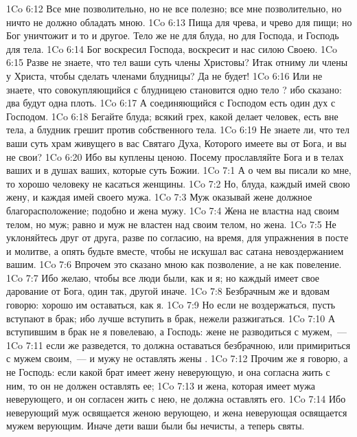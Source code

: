 \rsbpar\vs 1Co 6:12 Все мне позволительно, но не все полезно; все мне позволительно, но ничто не должно обладать мною.
\vs 1Co 6:13 Пища для чрева, и чрево для пищи; но Бог уничтожит и то и другое. Тело же не для блуда, но для Господа, и Господь для тела.
\vs 1Co 6:14 Бог воскресил Господа, воскресит и нас силою Своею.
\rsbpar\vs 1Co 6:15 Разве не знаете, что тел ваши суть члены Христовы? Итак отниму ли члены у Христа, чтобы сделать  членами блудницы? Да не будет!
\vs 1Co 6:16 Или не знаете, что совокупляющийся с блудницею становится одно тело ? ибо сказано: два будут одна плоть.
\vs 1Co 6:17 А соединяющийся с Господом есть один дух с Господом.
\vs 1Co 6:18 Бегайте блуда; всякий грех, какой делает человек, есть вне тела, а блудник грешит против собственного тела.
\vs 1Co 6:19 Не знаете ли, что тел ваши суть храм живущего в вас Святаго Духа, Которого имеете вы от Бога, и вы не свои?
\vs 1Co 6:20 Ибо вы куплены  ценою. Посему прославляйте Бога и в телах ваших и в душах ваших, которые суть Божии.
\vs 1Co 7:1 А о чем вы писали ко мне, то хорошо человеку не касаться женщины.
\vs 1Co 7:2 Но,  блуда, каждый имей свою жену, и каждая имей своего мужа.
\vs 1Co 7:3 Муж оказывай жене должное благорасположение; подобно и жена мужу.
\vs 1Co 7:4 Жена не властна над своим телом, но муж; равно и муж не властен над своим телом, но жена.
\vs 1Co 7:5 Не уклоняйтесь друг от друга, разве по согласию, на время, для упражнения в посте и молитве, а  опять будьте вместе, чтобы не искушал вас сатана невоздержанием вашим.
\vs 1Co 7:6 Впрочем это сказано мною как позволение, а не как повеление.
\vs 1Co 7:7 Ибо желаю, чтобы все люди были, как и я; но каждый имеет свое дарование от Бога, один так, другой иначе.
\rsbpar\vs 1Co 7:8 Безбрачным же и вдовам говорю: хорошо им оставаться, как я.
\vs 1Co 7:9 Но если не  воздержаться, пусть вступают в брак; ибо лучше вступить в брак, нежели разжигаться.
\vs 1Co 7:10 А вступившим в брак не я повелеваю, а Господь: жене не разводиться с мужем,~---
\vs 1Co 7:11 если же разведется, то должна оставаться безбрачною, или примириться с мужем своим,~--- и мужу не оставлять жены .
\vs 1Co 7:12 Прочим же я говорю, а не Господь: если какой брат имеет жену неверующую, и она согласна жить с ним, то он не должен оставлять ее;
\vs 1Co 7:13 и жена, которая имеет мужа неверующего, и он согласен жить с нею, не должна оставлять его.
\vs 1Co 7:14 Ибо неверующий муж освящается женою верующею, и жена неверующая освящается мужем верующим. Иначе дети ваши были бы нечисты, а теперь святы.
